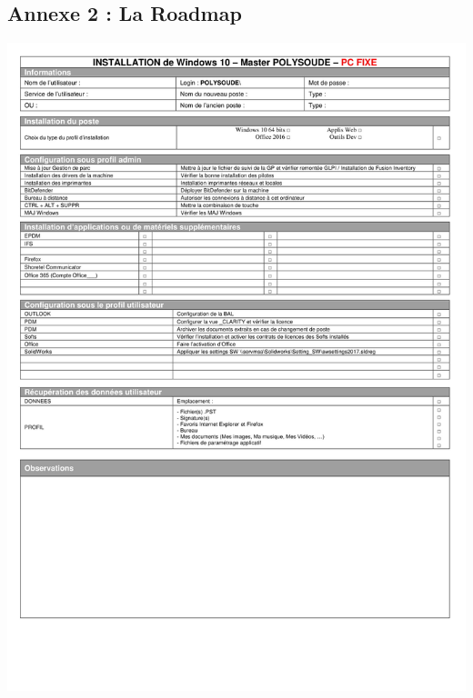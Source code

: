 \documentclass[11pt,a4paper,oneside]{article}
\begin{document}
\subsection{Annexe 2 : La Roadmap}
\includegraphics[width=\textwidth]{Ressources/Roadmap.jpg}
\end{document}

